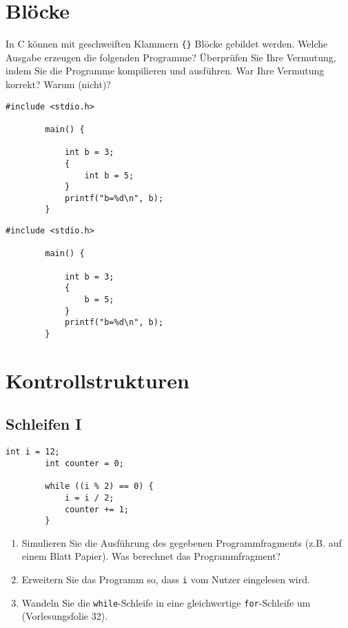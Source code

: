 \documentclass[]{article}
\begin{document}
	\section{Blöcke}
	
	In C können mit geschweiften Klammern \lstinline|{}| Blöcke gebildet werden.
	Welche Ausgabe erzeugen die folgenden Programme?
	Überprüfen Sie Ihre Vermutung, indem Sie die Programme kompilieren und ausführen.
	War Ihre Vermutung korrekt? Warum (nicht)?
	
	\noindent\begin{minipage}{.48\textwidth}
	\begin{lstlisting}[gobble=4,frame=single]
		#include <stdio.h>
		
		main() {
			
			int b = 3;
			{
				int b = 5;
			}
			printf("b=%d\n", b);
		}
	\end{lstlisting}
	\end{minipage}\hspace{0.04\textwidth}
	\begin{minipage}{.48\textwidth}
	\begin{lstlisting}[gobble=4,frame=single]
		#include <stdio.h>
		
		main() {
			
			int b = 3;
			{
				b = 5;
			}
			printf("b=%d\n", b);
		}
	\end{lstlisting}
	\end{minipage}
	

	\section{Kontrollstrukturen}
	
	\subsection{Schleifen I}
	
	\begin{lstlisting}[gobble=4]
		int i = 12;
		int counter = 0;
		
		while ((i % 2) == 0) {
			i = i / 2;
			counter += 1;
		}
	\end{lstlisting}
	
	\begin{enumerate}
		\item Simulieren Sie die Ausführung des gegebenen Programmfragments (z.B. auf einem Blatt Papier).
		Was berechnet das Programmfragment? 
		\item Erweitern Sie das Programm so, dass \texttt{i} vom Nutzer eingelesen wird.
		\item Wandeln Sie die \texttt{while}-Schleife in eine gleichwertige \texttt{for}-Schleife um (Vorlesungsfolie 32).
	\end{enumerate}
	
\end{document}
